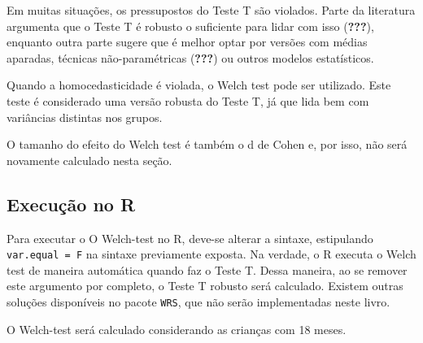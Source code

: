 \documentclass[
]{book}
\newenvironment{Shaded}{\begin{snugshade}}{\end{snugshade}}
\newcommand{\DataTypeTok}[1]{\textcolor[rgb]{0.13,0.29,0.53}{#1}}
\newcommand{\DecValTok}[1]{\textcolor[rgb]{0.00,0.00,0.81}{#1}}
\newcommand{\KeywordTok}[1]{\textcolor[rgb]{0.13,0.29,0.53}{\textbf{#1}}}
\newcommand{\NormalTok}[1]{#1}
\newcommand{\OperatorTok}[1]{\textcolor[rgb]{0.81,0.36,0.00}{\textbf{#1}}}
\newcommand{\OtherTok}[1]{\textcolor[rgb]{0.56,0.35,0.01}{#1}}
\newcommand{\StringTok}[1]{\textcolor[rgb]{0.31,0.60,0.02}{#1}}
\begin{document}
Em muitas situações, os pressupostos do Teste T são violados. Parte da
literatura argumenta que o Teste T é robusto o suficiente para lidar com
isso ({\textbf{???}}), enquanto outra parte sugere que é melhor optar
por versões com médias aparadas, técnicas não-paramétricas
({\textbf{???}}) ou outros modelos estatísticos.

Quando a homocedasticidade é violada, o Welch test pode ser utilizado.
Este teste é considerado uma versão robusta do Teste T, já que lida bem
com variâncias distintas nos grupos.

O tamanho do efeito do Welch test é também o d de Cohen e, por isso, não
será novamente calculado nesta seção.

\hypertarget{execuuxe7uxe3o-no-r-3}{%
\subsection{Execução no R}\label{execuuxe7uxe3o-no-r-3}}

Para executar o O Welch-test no R, deve-se alterar a sintaxe,
estipulando \texttt{var.equal\ =\ F} na sintaxe previamente exposta. Na
verdade, o R executa o Welch test de maneira automática quando faz o
Teste T. Dessa maneira, ao se remover este argumento por completo, o
Teste T robusto será calculado. Existem outras soluções disponíveis no
pacote \texttt{WRS}, que não serão implementadas neste livro.

O Welch-test será calculado considerando as crianças com 18 meses.

\begin{Shaded}
\end{Shaded}
\end{document}
